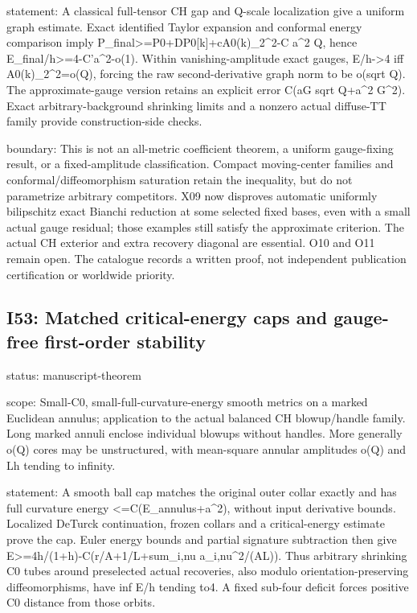 \documentclass[
  10pt,
]{article}
\begin{document}
statement: A classical full-tensor CH gap and Q-scale localization give
a uniform graph estimate. Exact identified Taylor expansion and
conformal energy comparison imply
P\_final\textgreater=P0+DP0{[}k{]}+c\textbar\textbar A0(k)\textbar\textbar\_2\^{}2-C
a\^{}2 Q, hence E\_final/h\textgreater=4-C'a\^{}2-o(1). Within
vanishing-amplitude exact gauges, E/h-\textgreater4 iff
\textbar\textbar A0(k)\textbar\textbar\_2\^{}2=o(Q), forcing the raw
second-derivative graph norm to be o(sqrt Q). The approximate-gauge
version retains an explicit error C(aG sqrt Q+a\^{}2 G\^{}2). Exact
arbitrary-background shrinking limits and a nonzero actual diffuse-TT
family provide construction-side checks.

boundary: This is not an all-metric coefficient theorem, a uniform
gauge-fixing result, or a fixed-amplitude classification. Compact
moving-center families and conformal/diffeomorphism saturation retain
the inequality, but do not parametrize arbitrary competitors. X09 now
disproves automatic uniformly bilipschitz exact Bianchi reduction at
some selected fixed bases, even with a small actual gauge residual;
those examples still satisfy the approximate criterion. The actual CH
exterior and extra recovery diagonal are essential. O10 and O11 remain
open. The catalogue records a written proof, not independent publication
certification or worldwide priority.

\hypertarget{i53-matched-critical-energy-caps-and-gauge-free-first-order-stability}{%
\subsection{I53: Matched critical-energy caps and gauge-free first-order
stability}\label{i53-matched-critical-energy-caps-and-gauge-free-first-order-stability}}

status: manuscript-theorem

scope: Small-C0, small-full-curvature-energy smooth metrics on a marked
Euclidean annulus; application to the actual balanced CH blowup/handle
family. Long marked annuli enclose individual blowups without handles.
More generally o(Q) cores may be unstructured, with mean-square annular
amplitudes o(Q) and Lh tending to infinity.

statement: A smooth ball cap matches the original outer collar exactly
and has full curvature energy \textless=C(E\_annulus+a\^{}2), without
input derivative bounds. Localized DeTurck continuation, frozen collars
and a critical-energy estimate prove the cap. Euler energy bounds and
partial signature subtraction then give
E\textgreater=4h/(1+h)-C(r/A+1/L+sum\_i,nu a\_i,nu\^{}2/(AL)). Thus
arbitrary shrinking C0 tubes around preselected actual recoveries, also
modulo orientation-preserving diffeomorphisms, have inf E/h tending to4.
A fixed sub-four deficit forces positive C0 distance from those orbits.
\end{document}
